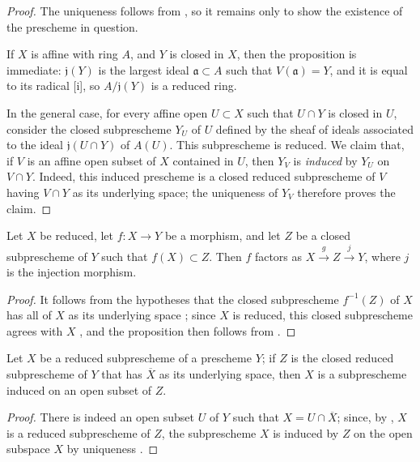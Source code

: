 \begin{proof}
The uniqueness follows from , so it remains only to show the existence of the prescheme in question.

If $X$ is affine with ring $A$, and $Y$ is closed in $X$, then the proposition is immediate:
$\mathfrak{j}(Y)$ is the largest ideal $\mathfrak{a}\subset A$ such that $V(\mathfrak{a})=Y$, and it is equal to its radical [i], so $A/\mathfrak{j}(Y)$ is a reduced ring.

In the general case, for every affine open $U\subset X$ such that $U\cap Y$ is closed in $U$, consider the closed subprescheme $Y_U$ of $U$ defined by the sheaf of ideals associated to the ideal $\mathfrak{j}(U\cap Y)$ of $A(U)$.
This subprescheme is reduced.
We claim that, if $V$ is an affine open subset of $X$ contained in $U$, then $Y_V$ is \emph{induced} by $Y_U$ on $V\cap Y$.
Indeed, this induced prescheme is a closed reduced subprescheme of $V$ having $V\cap Y$ as its underlying space;
the uniqueness of $Y_V$ therefore proves the claim.
\end{proof}

\begin{proposition}[5.2.2]
\label{I.5.2.2}
Let $X$ be reduced, let $f:X \to Y$ be a morphism, and let $Z$ be a closed subprescheme of $Y$ such that $f(X) \subset Z$.
Then $f$ factors as $X \xrightarrow{g} Z \xrightarrow{j} Y$, where $j$ is the injection morphism.
\end{proposition}

\begin{proof}
It follows from the hypotheses that the closed subprescheme $f^{-1}(Z)$ of $X$ has all of $X$ as its underlying space ;
since $X$ is reduced, this closed subprescheme agrees with $X$ , and the proposition then follows from .
\end{proof}

\begin{corollary}[5.2.3]
\label{I.5.2.3}
Let $X$ be a reduced subprescheme of a prescheme $Y$; if $Z$ is the closed reduced subprescheme of $Y$ that has $\overline{X}$ as its underlying space, then $X$ is a subprescheme induced on an open subset of $Z$.
\end{corollary}

\begin{proof}
There is indeed an open subset $U$ of $Y$ such that $X=U\cap\overline{X}$;
since, by , $X$ is a reduced subprescheme of $Z$, the subprescheme $X$ is induced by $Z$ on the open subspace $X$ by uniqueness .
\end{proof}

